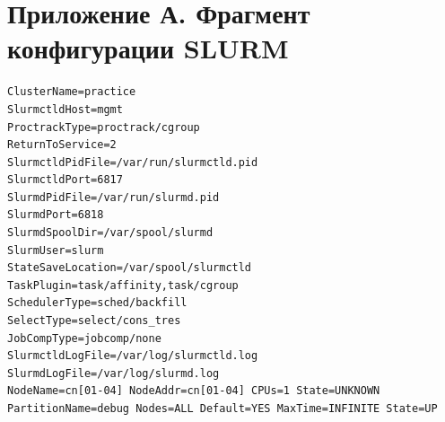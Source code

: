 \section*{Приложение А. Фрагмент конфигурации SLURM}
\label{app:slurm-conf}

\renewcommand{\theFancyVerbLine}{%
    \scriptsize\ttfamily\textcolor{gray}{\arabic{FancyVerbLine}}%
}

\begin{verbatim}
ClusterName=practice
SlurmctldHost=mgmt
ProctrackType=proctrack/cgroup
ReturnToService=2
SlurmctldPidFile=/var/run/slurmctld.pid
SlurmctldPort=6817
SlurmdPidFile=/var/run/slurmd.pid
SlurmdPort=6818
SlurmdSpoolDir=/var/spool/slurmd
SlurmUser=slurm
StateSaveLocation=/var/spool/slurmctld
TaskPlugin=task/affinity,task/cgroup
SchedulerType=sched/backfill
SelectType=select/cons_tres
JobCompType=jobcomp/none
SlurmctldLogFile=/var/log/slurmctld.log
SlurmdLogFile=/var/log/slurmd.log
NodeName=cn[01-04] NodeAddr=cn[01-04] CPUs=1 State=UNKNOWN
PartitionName=debug Nodes=ALL Default=YES MaxTime=INFINITE State=UP
\end{verbatim}

